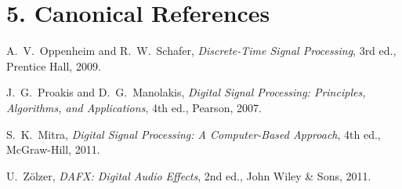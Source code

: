 \documentclass[11pt,a4paper]{article}
\begin{document}
\vspace{6pt}
\section*{5. Canonical References}
\begin{enumerate}[label={[\arabic*]},leftmargin=22pt,itemsep=2pt]
\item A.~V.~Oppenheim and R.~W.~Schafer, \textit{Discrete-Time Signal Processing}, 3rd ed., Prentice Hall, 2009.
\item J.~G.~Proakis and D.~G.~Manolakis, \textit{Digital Signal Processing: Principles, Algorithms, and Applications}, 4th ed., Pearson, 2007.
\item S.~K.~Mitra, \textit{Digital Signal Processing: A Computer-Based Approach}, 4th ed., McGraw-Hill, 2011.
\item U.~Z\"olzer, \textit{DAFX: Digital Audio Effects}, 2nd ed., John Wiley \& Sons, 2011.
\end{enumerate}
\end{document}

